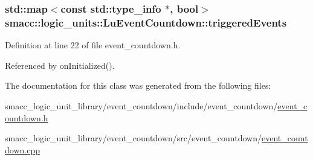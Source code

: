 \subsubsection[{\texorpdfstring{triggered\+Events}{triggeredEvents}}]{\setlength{\rightskip}{0pt plus 5cm}std\+::map$<$const std\+::type\+\_\+info $\ast$, {\bf bool}$>$ smacc\+::logic\+\_\+units\+::\+Lu\+Event\+Countdown\+::triggered\+Events\hspace{0.3cm}{\ttfamily [private]}}\hypertarget{classsmacc_1_1logic__units_1_1LuEventCountdown_abfce05c5bf4dd9cb5009c95f186ef25a}{}\label{classsmacc_1_1logic__units_1_1LuEventCountdown_abfce05c5bf4dd9cb5009c95f186ef25a}


Definition at line 22 of file event\+\_\+countdown.\+h.



Referenced by on\+Initialized().



The documentation for this class was generated from the following files\+:\begin{DoxyCompactItemize}
\item 
smacc\+\_\+logic\+\_\+unit\+\_\+library/event\+\_\+countdown/include/event\+\_\+countdown/\hyperlink{event__countdown_8h}{event\+\_\+countdown.\+h}\item 
smacc\+\_\+logic\+\_\+unit\+\_\+library/event\+\_\+countdown/src/event\+\_\+countdown/\hyperlink{event__countdown_8cpp}{event\+\_\+countdown.\+cpp}\end{DoxyCompactItemize}
